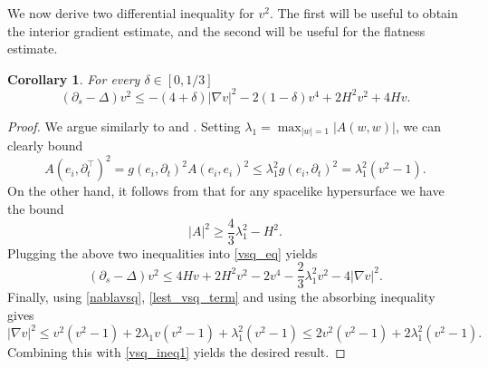 \documentclass[leqno,11pt]{amsart}
\newtheorem{corollary}[theorem]{Corollary}
\theoremstyle{definition}
\begin{document}
We now derive two differential inequality for $v^2$. The first will be useful to obtain the interior gradient estimate, and the second will be useful for the flatness estimate.  
\begin{corollary}
For every $\delta\in [0,1/3]$ 
\begin{equation}\label{v_evolve_ineq}
(\partial_s-\Delta) v^2 \leq -(4+\delta)|\nabla v|^2 -2(1-\delta) v^4 +2H^2v^2+4Hv.
\end{equation}
\end{corollary}
\begin{proof}
We argue similarly to \cite[Theorem 3.1]{Bartnik} and \cite[Proposition 4.4]{Ecker_Huisken_lor}. Setting $\lambda_1=\max_{|w|=1}{|A(w,w)|}$, we can clearly bound
\begin{equation}\label{lest_vsq_term}
A(e_i,\partial_t^{\top})^2=g(e_i,\partial_t)^2A(e_i,e_i)^2 \leq \lambda_1^2 g(e_i,\partial_t)^2=\lambda_1^2(v^2-1).
\end{equation}
On the other hand, it follows from \cite[Eq. 3.17]{Bartnik} that for any spacelike hypersurface we have the bound 
\begin{equation}
|A|^2 \geq \frac{4}{3}\lambda_1^2-H^2.
\end{equation}
Plugging the above two inequalities into \eqref{vsq_eq} yields 
\begin{equation}\label{vsq_ineq1}
\left(\partial_s-\Delta\right)v^2 \leq 4Hv+2H^2v^2-2v^4-\frac{2}{3}\lambda_1^2v^2-4|\nabla v|^2.
\end{equation}
Finally, using  \eqref{nablavsq}, \eqref{lest_vsq_term} and using the absorbing inequality gives
\begin{equation}\label{gradv_norm_2}
|\nabla v|^2 \leq v^2(v^2-1)+2\lambda_1v(v^2-1)+\lambda_1^2(v^2-1) \leq 2v^2(v^2-1)+2\lambda_1^2(v^2-1).
\end{equation}
Combining this with \eqref{vsq_ineq1} yields the desired result.
\end{proof}
\end{document}
